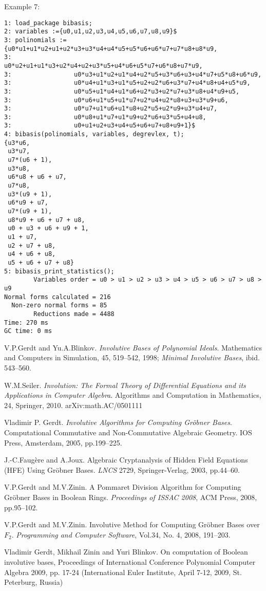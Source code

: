 \noindent Example 7:
\begin{verbatim}
1: load_package bibasis;
2: variables :={u0,u1,u2,u3,u4,u5,u6,u7,u8,u9}$
3: polinomials := {u0*u1+u1*u2+u1+u2*u3+u3*u4+u4*u5+u5*u6+u6*u7+u7*u8+u8*u9,
3:                 u0*u2+u1+u1*u3+u2*u4+u2+u3*u5+u4*u6+u5*u7+u6*u8+u7*u9,
3:                 u0*u3+u1*u2+u1*u4+u2*u5+u3*u6+u3+u4*u7+u5*u8+u6*u9,
3:                 u0*u4+u1*u3+u1*u5+u2+u2*u6+u3*u7+u4*u8+u4+u5*u9,
3:                 u0*u5+u1*u4+u1*u6+u2*u3+u2*u7+u3*u8+u4*u9+u5,
3:                 u0*u6+u1*u5+u1*u7+u2*u4+u2*u8+u3+u3*u9+u6,
3:                 u0*u7+u1*u6+u1*u8+u2*u5+u2*u9+u3*u4+u7,
3:                 u0*u8+u1*u7+u1*u9+u2*u6+u3*u5+u4+u8,
3:                 u0+u1+u2+u3+u4+u5+u6+u7+u8+u9+1}$
4: bibasis(polinomials, variables, degrevlex, t);
{u3*u6,
 u3*u7,
 u7*(u6 + 1),
 u3*u8,
 u6*u8 + u6 + u7,
 u7*u8,
 u3*(u9 + 1),
 u6*u9 + u7,
 u7*(u9 + 1),
 u8*u9 + u6 + u7 + u8,
 u0 + u3 + u6 + u9 + 1,
 u1 + u7,
 u2 + u7 + u8,
 u4 + u6 + u8,
 u5 + u6 + u7 + u8}
5: bibasis_print_statistics();
        Variables order = u0 > u1 > u2 > u3 > u4 > u5 > u6 > u7 > u8 > u9
Normal forms calculated = 216
  Non-zero normal forms = 85
        Reductions made = 4488
Time: 270 ms
GC time: 0 ms

\end{verbatim}


\begin{thebibliography}{99}

 V.P.Gerdt and Yu.A.Blinkov. {\em Involutive Bases of Polynomial Ideals}. 
Mathematics and Computers in Simulation, 45, 519--542, 1998; {\em Minimal Involutive Bases}, ibid. 543--560.
 
 W.M.Seiler. {\em Involution: The Formal Theory of Differential Equations and its Applications 
in Computer Algebra}. Algorithms and Computation in Mathematics, 24, Springer, 2010.  arXiv:math.AC/0501111

 Vladimir P. Gerdt. {\em Involutive Algorithms for Computing Gr\"obner Bases}.
Computational Commutative and Non-Commutative Algebraic Geometry. IOS Press, Amsterdam, 2005, pp.199--225.

J.-C.Faug\`{e}re and A.Joux. Algebraic Cryptanalysis of Hidden Field Equations
(HFE) Using Gr\"obner Bases. {\em LNCS} 2729, Springer-Verlag, 2003, pp.44--60.

V.P.Gerdt and M.V.Zinin. A Pommaret Division Algorithm for Computing Gr\"obner Bases in Boolean Rings.
{\em Proceedings of ISSAC 2008}, ACM Press, 2008, pp.95--102.

V.P.Gerdt and M.V.Zinin. Involutive Method for Computing Gr\"obner Bases over $F_2$.
{\em Programming and Computer Software}, Vol.34, No. 4, 2008, 191--203.

Vladimir Gerdt, Mikhail Zinin and Yuri Blinkov. On computation of Boolean involutive bases,
Proceedings of International Conference Polynomial Computer Algebra 2009, pp. 17-24
(International Euler Institute, April 7-12, 2009, St. Peterburg, Russia)


\end{thebibliography}
